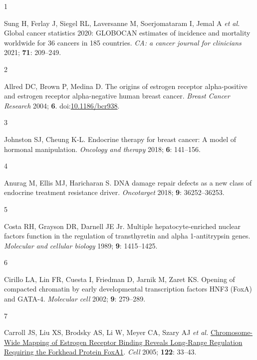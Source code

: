 \documentclass[
  12pt,
]{article}
\newlength{\cslhangindent}
\newlength{\csllabelwidth}
\newlength{\cslentryspacingunit} %
\newenvironment{CSLReferences}[2] %
 {%
  \setlength{\parindent}{0pt}
  \ifodd #1
  \let\oldpar\par
  \def\par{\hangindent=\cslhangindent\oldpar}
  \fi
  \setlength{\parskip}{#2\cslentryspacingunit}
 }%
 {}
\newcommand{\CSLLeftMargin}[1]{\parbox[t]{\csllabelwidth}{#1}}
\newcommand{\CSLRightInline}[1]{\parbox[t]{\linewidth - \csllabelwidth}{#1}\break}
\begin{document}
\hypertarget{refs}{}
\begin{CSLReferences}{0}{0}
\leavevmode{}%
\CSLLeftMargin{1 }%
\CSLRightInline{Sung H, Ferlay J, Siegel RL, Laversanne M, Soerjomataram I, Jemal A \emph{et al.} Global cancer statistics 2020: {GLOBOCAN} estimates of incidence and mortality worldwide for 36 cancers in 185 countries. \emph{CA: a cancer journal for clinicians} 2021; \textbf{71}: 209--249.}

\leavevmode{}%
\CSLLeftMargin{2 }%
\CSLRightInline{Allred DC, Brown P, Medina D. The origins of estrogen receptor alpha-positive and estrogen receptor alpha-negative human breast cancer. \emph{Breast Cancer Research} 2004; \textbf{6}. doi:\href{https://doi.org/10.1186/bcr938}{10.1186/bcr938}.}

\leavevmode{}%
\CSLLeftMargin{3 }%
\CSLRightInline{Johnston SJ, Cheung K-L. Endocrine therapy for breast cancer: A model of hormonal manipulation. \emph{Oncology and therapy} 2018; \textbf{6}: 141--156.}

\leavevmode{}%
\CSLLeftMargin{4 }%
\CSLRightInline{Anurag M, Ellis MJ, Haricharan S. {DNA} damage repair defects as a new class of endocrine treatment resistance driver. \emph{Oncotarget} 2018; \textbf{9}: 36252--36253.}

\leavevmode{}%
\CSLLeftMargin{5 }%
\CSLRightInline{Costa RH, Grayson DR, Darnell JE Jr. Multiple hepatocyte-enriched nuclear factors function in the regulation of transthyretin and alpha 1-antitrypsin genes. \emph{Molecular and cellular biology} 1989; \textbf{9}: 1415--1425.}

\leavevmode{}%
\CSLLeftMargin{6 }%
\CSLRightInline{Cirillo LA, Lin FR, Cuesta I, Friedman D, Jarnik M, Zaret KS. Opening of compacted chromatin by early developmental transcription factors {HNF3} ({FoxA}) and {GATA-4}. \emph{Molecular cell} 2002; \textbf{9}: 279--289.}

\leavevmode{}%
\CSLLeftMargin{7 }%
\CSLRightInline{Carroll JS, Liu XS, Brodsky AS, Li W, Meyer CA, Szary AJ \emph{et al.} \href{https://doi.org/10.1016/j.cell.2005.05.008}{Chromosome-Wide Mapping of Estrogen Receptor Binding Reveals Long-Range Regulation Requiring the Forkhead Protein FoxA1}. \emph{Cell} 2005; \textbf{122}: 33--43.}


\end{CSLReferences}
\end{document}
